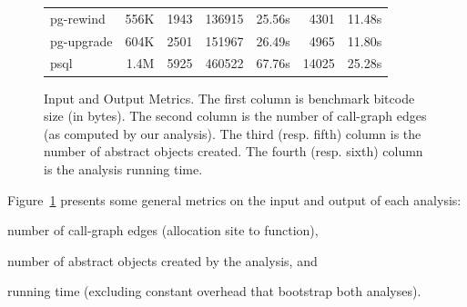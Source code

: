 \begin{figure}[t]
\begin{tabular}{l@{\quad}r r@{\quad}rr rr}
    pg-rewind  & 556K & 1943 & 136915 & 25.56s &  4301 & 11.48s \\
    pg-upgrade & 604K & 2501 & 151967 & 26.49s &  4965 & 11.80s \\
    psql       & 1.4M & 5925 & 460522 & 67.76s & 14025 & 25.28s \\
    \bottomrule
  \end{tabular}
  \caption[Input and Output Metrics]{%
    Input and Output Metrics. The first column is benchmark bitcode
    size (in bytes). The second column is the number of call-graph
    edges (as computed by our analysis). The third (resp. fifth)
    column is the number of abstract objects created. The fourth
    (resp. sixth) column is the analysis running time.}
  \label{structsens/fig/stats:misc}
\end{figure}

Figure~\ref{structsens/fig/stats:misc} presents some general metrics
on the input and output of each analysis:
\begin{inparaenum}[(i)]
\item number of call-graph edges (allocation site to function),
\item number of abstract objects created by the analysis, and
\item running time (excluding constant overhead that bootstrap both
  analyses).
\end{inparaenum}

